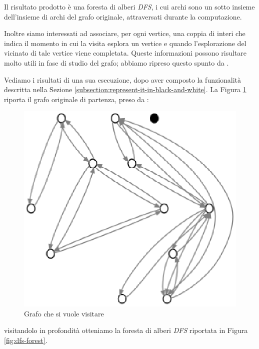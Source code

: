 Il risultato prodotto \`e una foresta di alberi \emph{DFS}, i cui
archi sono un sotto insieme dell'insieme di archi del grafo originale,
attraversati durante la computazione.

Inoltre siamo interessati ad associare, per ogni vertice, una coppia
di interi che indica il momento in cui la visita esplora un vertice e
quando l'esplorazione del vicinato di tale vertice viene
completata. Queste informazioni possono risultare molto utili in fase
di studio del grafo; abbiamo ripreso questo spunto da
\cite{Algorithms}.

Vediamo i risultati di una sua esecuzione, dopo aver composto la
funzionalit\`a descritta nella Sezione
\ref{subsection:represent-it-in-black-and-white}. La Figura
\ref{fig:before-applying-dfs-search} riporta il grafo originale di
partenza, preso da \cite{Algorithms}:
\begin{figure}
  \centering
  \includegraphics{images/OnePipingLevelUnitTest_Printer_DFS_PrinterPipe_Papadimitriou-phase-PrinterPipeFilter-level-0.eps}
  \caption{Grafo che si vuole visitare}
  \label{fig:before-applying-dfs-search}
\end{figure}
visitandolo in profondit\`a otteniamo la foresta di alberi \emph{DFS}
riportata in Figura \ref{fig:dfs-forest}.
